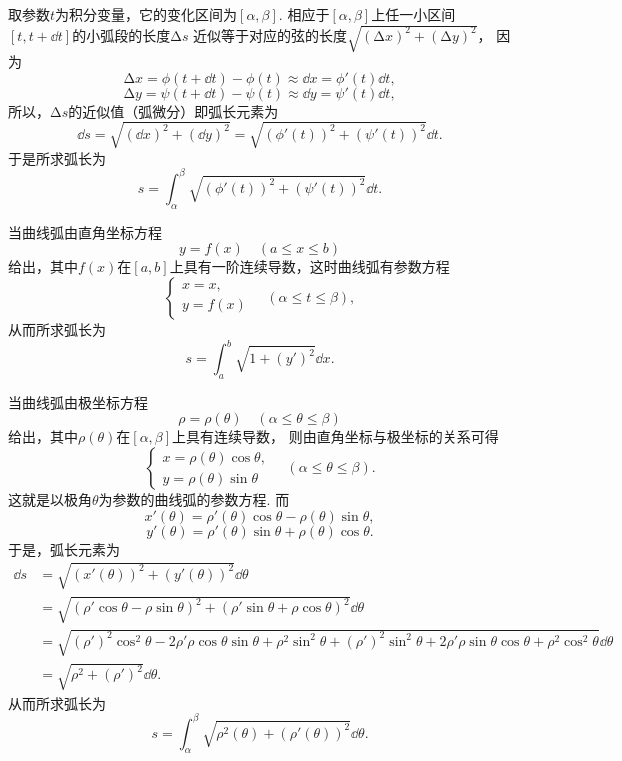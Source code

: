 取参数\(t\)为积分变量，它的变化区间为\([\alpha,\beta]\).
相应于\([\alpha,\beta]\)上任一小区间\([t,t+\dd{t}]\)的小弧段的长度\(\increment s\)
近似等于对应的弦的长度\(\sqrt{(\increment x)^2+(\increment y)^2}\)，
因为\[
	\increment x
	= \phi(t+\dd{t})-\phi(t)
	\approx \dd{x}
	= \phi'(t) \dd{t},
\]\[
	\increment y
	= \psi(t+\dd{t})-\psi(t)
	\approx \dd{y}
	= \psi'(t) \dd{t},
\]
所以，\(\increment s\)的近似值（弧微分）即弧长元素为\[
	\dd{s} = \sqrt{(\dd{x})^2 + (\dd{y})^2}
	= \sqrt{(\phi'(t))^2 + (\psi'(t))^2} \dd{t}.
\]
于是所求弧长为\begin{equation}
	s = \int_\alpha^\beta \sqrt{(\phi'(t))^2 + (\psi'(t))^2} \dd{t}.
\end{equation}

当曲线弧由直角坐标方程\[
y = f(x) \quad(a \leq x \leq b)
\]给出，其中\(f(x)\)在\([a,b]\)上具有一阶连续导数，这时曲线弧有参数方程\[
	\left\{ \begin{array}{l}
		x = x, \\
		y = f(x)
	\end{array} \right.
	\quad(\alpha \leq t \leq \beta),
\]
从而所求弧长为\begin{equation}
	s = \int_a^b \sqrt{1+(y')^2} \dd{x}.
\end{equation}

当曲线弧由极坐标方程\[
	\rho=\rho(\theta)
	\quad(\alpha \leq \theta \leq \beta)
\]给出，其中\(\rho(\theta)\)在\([\alpha,\beta]\)上具有连续导数，
则由直角坐标与极坐标的关系可得\[
	\left\{ \begin{array}{c}
		x = \rho(\theta) \cos\theta, \\
		y = \rho(\theta) \sin\theta
	\end{array} \right.
	\quad(\alpha \leq \theta \leq \beta).
\]
这就是以极角\(\theta\)为参数的曲线弧的参数方程.
而\[
	x'(\theta) = \rho'(\theta) \cos\theta - \rho(\theta) \sin\theta,
\]\[
	y'(\theta) = \rho'(\theta) \sin\theta + \rho(\theta) \cos\theta.
\]
于是，弧长元素为\begin{align*}
	\dd{s}
	&= \sqrt{(x'(\theta))^2 + (y'(\theta))^2} \dd{\theta} \\
	&= \sqrt{(\rho' \cos\theta - \rho \sin\theta)^2
		+ (\rho' \sin\theta + \rho \cos\theta)^2} \dd{\theta} \\
	&= \sqrt{(\rho')^2\cos^2\theta-2\rho'\rho\cos\theta\sin\theta+\rho^2\sin^2\theta
		+ (\rho')^2\sin^2\theta+2\rho'\rho\sin\theta\cos\theta+\rho^2\cos^2\theta} \dd{\theta} \\
	&= \sqrt{\rho^2 + (\rho')^2} \dd{\theta}.
\end{align*}
从而所求弧长为\begin{equation}
	s = \int_\alpha^\beta \sqrt{\rho^2(\theta) + (\rho'(\theta))^2} \dd{\theta}.
\end{equation}

